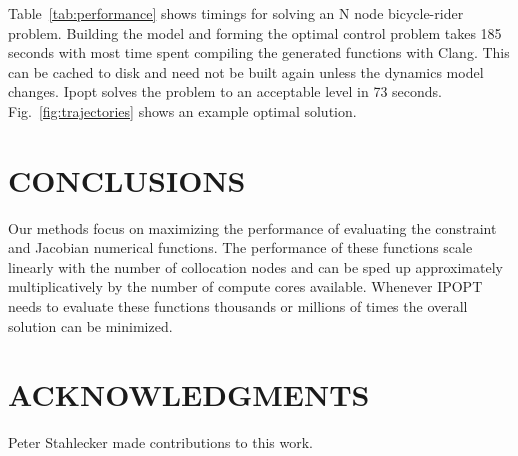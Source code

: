 \documentclass[11pt,twocolumn]{article}
\begin{document}
Table~\ref{tab:performance} shows timings for solving an N node bicycle-rider
problem. Building the model and forming the optimal control problem takes 185
seconds with most time spent compiling the generated functions with Clang. This
can be cached to disk and need not be built again unless the dynamics model
changes. Ipopt solves the problem to an acceptable level in 73 seconds.
Fig.~\ref{fig:trajectories} shows an example optimal solution.

\section*{CONCLUSIONS}
%
Our methods focus on maximizing the performance of evaluating the constraint and
Jacobian numerical functions. The performance of these functions scale linearly
with the number of collocation nodes and can be sped up approximately
multiplicatively by the number of compute cores available. Whenever IPOPT needs
to evaluate these functions thousands or millions of times the overall solution
can be minimized.




\section*{ACKNOWLEDGMENTS}
%
Peter Stahlecker made contributions to this work.
\end{document}
